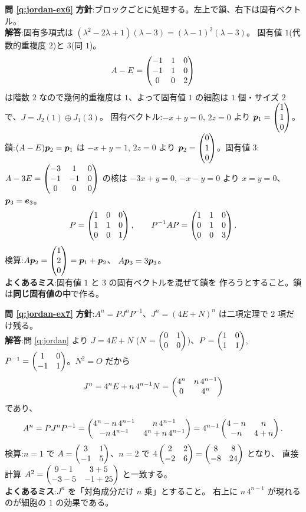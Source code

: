 \bigskip
\noindent\textbf{問 \ref{q:jordan-ex6}}\quad
\textbf{方針}:ブロックごとに処理する。左上で鎖、右下は固有ベクトル。\\
\textbf{解答}:固有多項式は
$(\lambda^2 - 2\lambda + 1)(\lambda - 3) = (\lambda - 1)^2(\lambda - 3)$。
固有値 $1$(代数的重複度 $2$)と $3$(同 $1$)。
\[
A - E = \begin{pmatrix}-1 & 1 & 0 \\ -1 & 1 & 0 \\ 0 & 0 & 2\end{pmatrix}
\]
は階数 $2$ なので幾何的重複度は $1$、よって固有値 $1$ の細胞は
$1$ 個・サイズ $2$ で、$J = J_2(1) \oplus J_1(3)$。
固有ベクトル:$-x + y = 0$, $2z = 0$ より $\bm{p}_1 = \begin{pmatrix}1 \\ 1 \\ 0\end{pmatrix}$。
鎖:$(A - E)\bm{p}_2 = \bm{p}_1$ は $-x + y = 1$, $2z = 0$ より
$\bm{p}_2 = \begin{pmatrix}0 \\ 1 \\ 0\end{pmatrix}$。固有値 $3$:
$A - 3E = \begin{pmatrix}-3 & 1 & 0 \\ -1 & -1 & 0 \\ 0 & 0 & 0\end{pmatrix}$ の核は
$-3x + y = 0$, $-x - y = 0$ より $x = y = 0$、$\bm{p}_3 = \bm{e}_3$。
\[
P = \begin{pmatrix}1 & 0 & 0 \\ 1 & 1 & 0 \\ 0 & 0 & 1\end{pmatrix}, \qquad
P^{-1}AP = \begin{pmatrix}1 & 1 & 0 \\ 0 & 1 & 0 \\ 0 & 0 & 3\end{pmatrix}.
\]
検算:$A\bm{p}_2 = \begin{pmatrix}1 \\ 2 \\ 0\end{pmatrix} = \bm{p}_1 + \bm{p}_2$、
$A\bm{p}_3 = 3\bm{p}_3$。\\
\textbf{よくあるミス}:固有値 $1$ と $3$ の固有ベクトルを混ぜて鎖を
作ろうとすること。鎖は\textbf{同じ固有値の中}で作る。

\bigskip
\noindent\textbf{問 \ref{q:jordan-ex7}}\quad
\textbf{方針}:$A^n = PJ^nP^{-1}$、$J^n = (4E + N)^n$ は二項定理で
$2$ 項だけ残る。\\
\textbf{解答}:問 \ref{q:jordan} より $J = 4E + N$
($N = \begin{pmatrix}0 & 1 \\ 0 & 0\end{pmatrix}$)、$P = \begin{pmatrix}1 & 0 \\ 1 & 1\end{pmatrix}$,
$P^{-1} = \begin{pmatrix}1 & 0 \\ -1 & 1\end{pmatrix}$。$N^2 = O$ だから
\[
J^n = 4^n E + n\,4^{n-1}N = \begin{pmatrix}4^n & n\,4^{n-1} \\ 0 & 4^n\end{pmatrix}
\]
であり、
\[
A^n = P J^n P^{-1}
= \begin{pmatrix}4^n - n\,4^{n-1} & n\,4^{n-1} \\ -n\,4^{n-1} & 4^n + n\,4^{n-1}\end{pmatrix}
= 4^{n-1}\begin{pmatrix}4 - n & n \\ -n & 4 + n\end{pmatrix}.
\]
検算:$n = 1$ で $A = \begin{pmatrix}3 & 1 \\ -1 & 5\end{pmatrix}$、$n = 2$ で
$4\begin{pmatrix}2 & 2 \\ -2 & 6\end{pmatrix} = \begin{pmatrix}8 & 8 \\ -8 & 24\end{pmatrix}$ となり、
直接計算 $A^2 = \begin{pmatrix}9 - 1 & 3 + 5 \\ -3 - 5 & -1 + 25\end{pmatrix}$ と一致する。\\
\textbf{よくあるミス}:$J^n$ を「対角成分だけ $n$ 乗」とすること。
右上に $n\,4^{n-1}$ が現れるのが細胞の $1$ の効果である。

